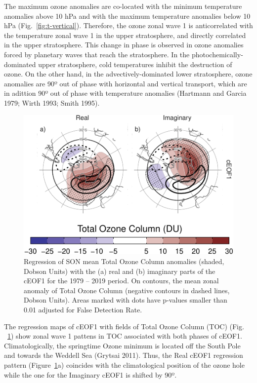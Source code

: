 \documentclass[smallextended]{svjour3}       %
\begin{document}
The maximum ozone anomalies are co-located with the minimum temperature anomalies above 10 hPa and with the maximum temperature anomalies below 10 hPa (Fig.~\ref{fig:t-vertical}). Therefore, the ozone zonal wave 1 is anticorrelated with the temperature zonal wave 1 in the upper stratosphere, and directly correlated in the upper stratosphere. This change in phase is observed in ozone anomalies forced by planetary waves that reach the stratosphere. In the photochemically-dominated upper stratosphere, cold temperatures inhibit the destruction of ozone. On the other hand, in the advectively-dominated lower stratosphere, ozone anomalies are 90º out of phase with horizontal and vertical transport, which are in adittion 90º out of phase with temperature anomalies (Hartmann and Garcia 1979; Wirth 1993; Smith 1995).



\begin{figure}
\centering
\includegraphics{../figures/o3-regr-1.pdf}
\caption{\label{fig:o3-regr}Regression of SON mean Total Ozone Column anomalies (shaded, Dobson Units) with the (a) real and (b) imaginary parts of the cEOF1 for the 1979 -- 2019 period. On contours, the mean zonal anomaly of Total Ozone Column (negative contours in dashed lines, Dobson Units). Areas marked with dots have p-values smaller than 0.01 adjusted for False Detection Rate.}
\end{figure}

The regression maps of cEOF1 with fields of Total Ozone Column (TOC) (Fig. ~\ref{fig:o3-regr}) show zonal wave 1 pattens in TOC associated with both phases of cEOF1. Climatologically, the springtime Ozone minimum is located off the South Pole and towards the Weddell Sea (Grytsai 2011).
Thus, the Real cEOF1 regression pattern (Figure~\ref{fig:o3-regr}a) coincides with the climatological position of the ozone hole while the one for the Imaginary cEOF1 is shifted by 90º.
\end{document}
